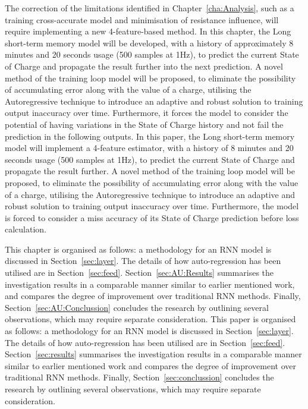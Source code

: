 %
{
The correction of the limitations identified in Chapter~\ref{cha:Analysis}, such as a training cross-accurate model and minimisation of resistance influence, will require implementing a new 4-feature-based method.
In this chapter, the Long short-term memory model will be developed, with a history of approximately 8 minutes and 20 seconds usage (500 samples at 1Hz), to predict the current State of Charge and propagate the result further into the next prediction.
A novel method of the training loop model will be proposed, to eliminate the possibility of accumulating error along with the value of a charge, utilising the Autoregressive technique to introduce an adaptive and robust solution to training output inaccuracy over time.
Furthermore, it forces the model to consider the potential of having variations in the State of Charge history and not fail the prediction in the following outputs.
} {
In this paper, the Long short-term memory model will implement a 4-feature estimator, with a history of 8 minutes and 20 seconds usage (500 samples at 1Hz), to predict the current State of Charge and propagate the result further.
A novel method of the training loop model will be proposed, to eliminate the possibility of accumulating error along with the value of a charge, utilising the Autoregressive technique to introduce an adaptive and robust solution to training output inaccuracy over time.
Furthermore, the model is forced to consider a miss accuracy of its State of Charge prediction before loss calculation.
}

%
%
{
This chapter is organised as follows: a methodology for an RNN model is discussed in Section~\ref{sec:layer}.
The details of how auto-regression has been utilised are in Section~\ref{sec:feed}.
Section~\ref{sec:AU:Results} summarises the investigation results in a comparable manner similar to earlier mentioned work, and compares the degree of improvement over traditional RNN methods.
Finally, Section~\ref{sec:AU:Conclussion} concludes the research by outlining several observations, which may require separate consideration.
} {
This paper is organised as follows: a methodology for an RNN model is discussed in Section~\ref{sec:layer}.
The details of how auto-regression has been utilised are in Section~\ref{sec:feed}.
Section~\ref{sec:results} summarises the investigation results in a comparable manner similar to earlier mentioned work and compares the degree of improvement over traditional RNN methods.
Finally, Section~\ref{sec:conclussion} concludes the research by outlining several observations, which may require separate consideration.
}
